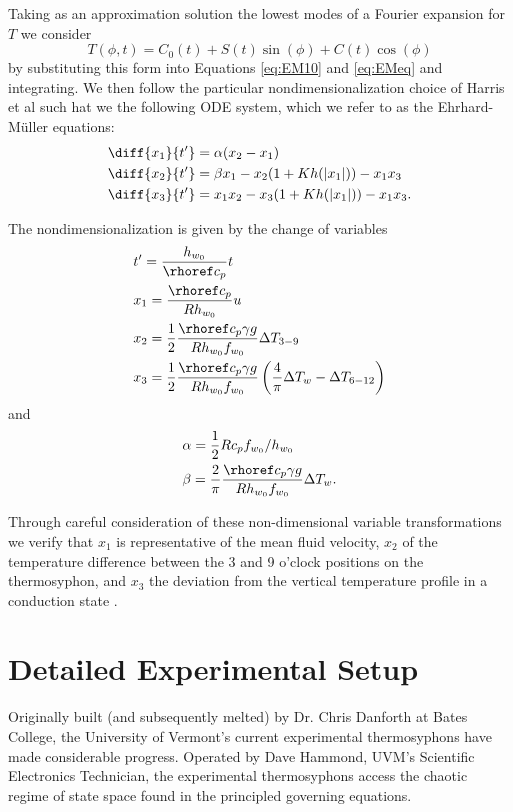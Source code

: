 Taking as an approximation solution the lowest modes of a Fourier expansion for $T$ we consider
\begin{equation} T(\phi , t) = C_0 (t) + S(t) \sin (\phi ) + C(t) \cos (\phi) \end{equation}
by substituting this form into Equations \ref{eq:EM10} and \ref{eq:EMeq} and integrating.
We then follow the particular nondimensionalization choice of Harris et al such hat we the following ODE system, which we refer to as the Ehrhard-M\"{u}ller equations:
\begin{align}
& \diff{x_1}{t'} = \alpha (x_2 - x_1)\\
& \diff{x_2}{t'} = \beta x_1 - x_2 (1 + Kh(|x_1|)) - x_1x_3\\
& \diff{x_3}{t'} = x_1x_2 - x_3 (1 + Kh(|x_1|)) - x_1x_3 .\end{align}

The nondimensionalization is given by the change of variables
\begin{align}
& t' = \frac{h_{w_0}}{\rhoref c_p}t\\
& x_1 = \frac{\rhoref c_p }{R h_{w_0}} u \\
& x_2 = \frac{1}{2} \frac{\rhoref c_p \gamma g}{ R h_{w_0} f_{w_0}} \Delta T_{3-9} \\
& x_3 = \frac{1}{2} \frac{\rhoref c_p \gamma g}{ R h_{w_0} f_{w_0}} \left ( \frac{4}{\pi} \Delta T_w - \Delta T_{6-12} \right ) 
\end{align}
and
\begin{align}
& \alpha = \frac{1}{2} R c_p f_{w_0} / h_{w_0} \\
& \beta = \frac{2}{\pi} \frac{\rhoref c_p \gamma g}{Rh_{w_0} f_{w_0}} \Delta T_w. \end{align}

Through careful consideration of these non-dimensional variable transformations we verify that $x_1$ is representative of the mean fluid velocity, $x_2$ of the temperature difference between the 3 and 9 o'clock positions on the thermosyphon, and $x_3$ the deviation from the vertical temperature profile in a conduction state .

\section{Detailed Experimental Setup}

Originally built (and subsequently melted) by Dr. Chris Danforth at Bates College, the University of Vermont's current experimental thermosyphons have made considerable progress.
Operated by Dave Hammond, UVM's Scientific Electronics Technician, the experimental thermosyphons access the chaotic regime of state space found in the principled governing equations.

